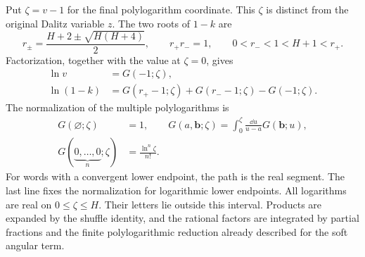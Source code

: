 Put $\zeta=v-1$ for the final polylogarithm coordinate. This $\zeta$ is
distinct from the original Dalitz variable $z$. The two roots of $1-k$ are
\begin{equation}
 r_\pm=\frac{H+2\pm\sqrt{H(H+4)}}2,\qquad
 r_+r_-=1,\qquad 0<r_-<1<H+1<r_+.
\end{equation}
Factorization, together with the value at $\zeta=0$, gives
\begin{align}
 \ln v&=G(-1;\zeta),\\
 \ln(1-k)&=G(r_+-1;\zeta)+G(r_--1;\zeta)-G(-1;\zeta).
\end{align}
The normalization of the multiple polylogarithms is
\begin{align}
 G(\varnothing;\zeta)&=1,\qquad
 G(a,\boldsymbol b;\zeta)
 =\int_0^\zeta\frac{\dd u}{u-a}G(\boldsymbol b;u),\\
 G(\underbrace{0,\ldots,0}_{n};\zeta)&=\frac{\ln^n\zeta}{n!}.
\end{align}
For words with a convergent lower endpoint, the path is the real segment.
The last line fixes the normalization for logarithmic lower endpoints.
All logarithms are real on $0\leq \zeta\leq H$. Their letters lie outside
this interval. Products are expanded by the shuffle identity, and the
rational factors are integrated by partial fractions and the finite
polylogarithmic reduction already described for the soft angular term.

